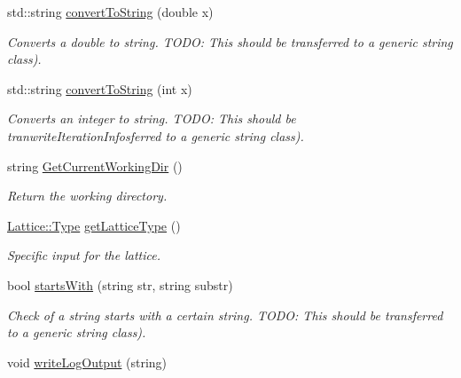 \begin{DoxyCompactItemize}
std\+::string \mbox{\hyperlink{classIO_a3a359eb873a40e3bf55b64b0ca1ced5f}{convert\+To\+String}} (double x)
\begin{DoxyCompactList}\small\item\em Converts a double to string. T\+O\+DO\+: This should be transferred to a generic string class). \end{DoxyCompactList}\item 
\mbox{\label{classIO_afb5b6ce5adacc6f99c112a8a82b7ff07}} 
std\+::string \mbox{\hyperlink{classIO_afb5b6ce5adacc6f99c112a8a82b7ff07}{convert\+To\+String}} (int x)
\begin{DoxyCompactList}\small\item\em Converts an integer to string. T\+O\+DO\+: This should be tranwrite\+Iteration\+Infosferred to a generic string class). \end{DoxyCompactList}\item 
\mbox{\label{classIO_ad96e22de53231443bbe314e79101ea71}} 
string \mbox{\hyperlink{classIO_ad96e22de53231443bbe314e79101ea71}{Get\+Current\+Working\+Dir}} ()
\begin{DoxyCompactList}\small\item\em Return the working directory. \end{DoxyCompactList}\item 
\mbox{\label{classIO_abbfd2a471e6d16478b4ae1534af54da5}} 
\mbox{\hyperlink{classLattice_a0521158021627f01f6bb0a9c72df65e2}{Lattice\+::\+Type}} \mbox{\hyperlink{classIO_abbfd2a471e6d16478b4ae1534af54da5}{get\+Lattice\+Type}} ()
\begin{DoxyCompactList}\small\item\em Specific input for the lattice. \end{DoxyCompactList}\item 
\mbox{\label{classIO_a0bd5601c77d94d3cccbd92ef98734e6c}} 
bool \mbox{\hyperlink{classIO_a0bd5601c77d94d3cccbd92ef98734e6c}{starts\+With}} (string str, string substr)
\begin{DoxyCompactList}\small\item\em Check of a string starts with a certain string. T\+O\+DO\+: This should be transferred to a generic string class). \end{DoxyCompactList}\item 
void \mbox{\hyperlink{classIO_a6e0785ec87e3b11635a4563977520a99}{write\+Log\+Output}} (string)

\end{DoxyCompactItemize}

